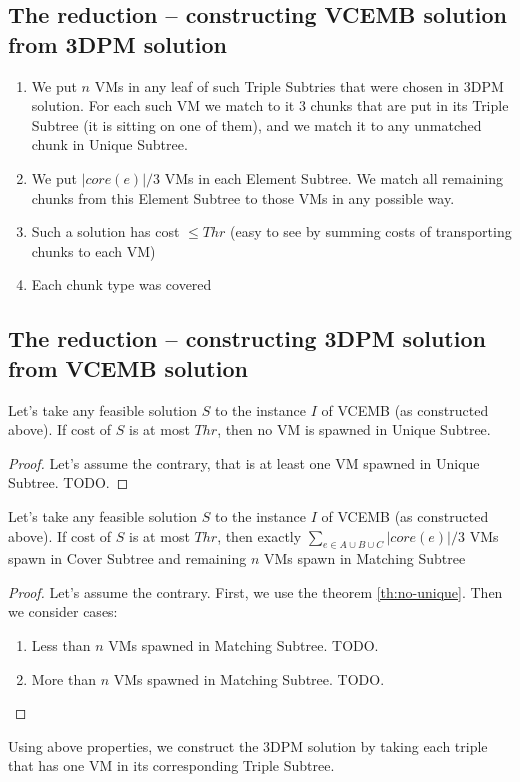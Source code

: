 \subsection{The reduction -- constructing VCEMB solution from 3DPM
  solution}

\begin{enumerate}
  \item We put $n$ VMs in any leaf of such Triple Subtries that were
  chosen in 3DPM solution. For each such VM we match to it 3 chunks
  that are put in its Triple Subtree (it is sitting on one of them),
  and we match it to any unmatched chunk in Unique Subtree.
  \item We put $|core(e)|/3$ VMs in each Element Subtree. We match all remaining
  chunks from this Element Subtree to those VMs in any possible
  way.
  \item Such a solution has cost $\leq Thr$ (easy to see by
  summing costs of transporting chunks to each VM)
  \item Each chunk type was covered
\end{enumerate}

\subsection{The reduction -- constructing 3DPM solution from VCEMB
  solution}

\begin{theorem}
  Let's take any feasible solution $S$ to the instance $I$ of VCEMB
  (as constructed above). If cost of $S$ is at most $Thr$, then no VM
  is spawned in Unique Subtree.
  \label{th:no-unique}
\end{theorem}

\begin{proof}
  Let's assume the contrary, that is at least one VM spawned in Unique
  Subtree. TODO.
\end{proof}

\begin{theorem}
  Let's take any feasible solution $S$ to the instance $I$ of VCEMB
  (as constructed above). If cost of $S$ is at most $Thr$, then
  exactly $\sum_{e\in A\cup B\cup C}|core(e)|/3$ VMs spawn in Cover
  Subtree and remaining $n$ VMs spawn in Matching Subtree
\end{theorem}

\begin{proof}
  Let's assume the contrary. First, we use the theorem
  \ref{th:no-unique}. Then we consider cases:
  \begin{enumerate}
    \item Less than $n$ VMs spawned in Matching Subtree. TODO.
    \item More than $n$ VMs spawned in Matching Subtree. TODO.
  \end{enumerate}
\end{proof}

Using above properties, we construct the 3DPM solution by taking each
triple that has one VM in its corresponding Triple Subtree.
